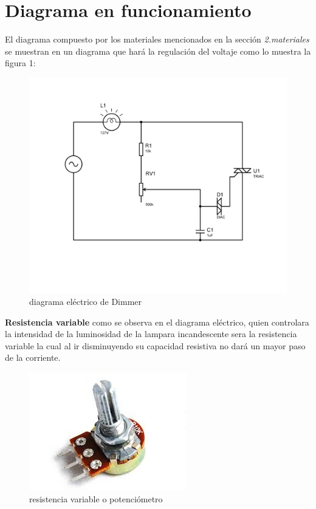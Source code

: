 \documentclass[11pt,a4paper]{article}
\begin{document}
\section{Diagrama en funcionamiento}

El diagrama compuesto por los materiales mencionados en la sección \emph{2.materiales} se muestran en un diagrama que hará la regulación del voltaje como lo muestra la figura 1:

\begin{figure}[h]
\begin{center}
\includegraphics[scale=0.2]{2.jpeg}
\caption{diagrama eléctrico de Dimmer}
\end{center}
\end{figure}

\newpage

\textbf{Resistencia variable} como se observa en el diagrama eléctrico, quien controlara la intensidad de la luminosidad de la lampara incandescente sera la resistencia variable la cual al ir disminuyendo su capacidad resistiva no dará un mayor paso de la corriente.\\

\begin{figure}[h]
\begin{center}
\includegraphics[scale=0.4]{3.jpeg}
\caption{resistencia variable o potenciómetro}
\end{center}
\end{figure}
\end{document}
